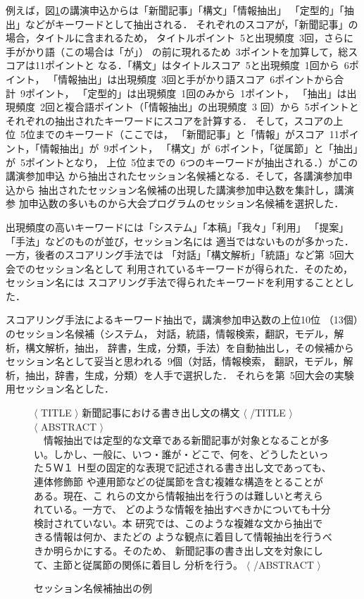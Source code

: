 例えば，図\ref{aaa}の講演申込からは「新聞記事」「構文」「情報抽出」
「定型的」「抽出」などがキーワードとして抽出される．
それぞれのスコアが，「新聞記事」の場合，タイトルに含まれるため，
タイトルポイント\ 5と出現頻度\ 3回，さらに手がかり語（この場合は「が」）
の前に現れるため\ 3ポイントを加算して，総スコアは11ポイントと
なる．「構文」はタイトルスコア\ 5と出現頻度\ 1回から\ 6ポイント，
「情報抽出」は出現頻度\ 3回と手がかり語スコア\ 6ポイントから合計\ 9ポイント，
「定型的」は出現頻度\ 1回のみから\ 1ポイント，
「抽出」は出現頻度\ 2回と複合語ポイント（「情報抽出」の出現頻度\ 3
回）から\ 5ポイントとそれぞれの抽出されたキーワードにスコアを計算する．
そして，スコアの上位\ 5位までのキーワード（ここでは，
「新聞記事」と「情報」がスコア\ 11ポイント，「情報抽出」が\ 9ポイント，
「構文」が\ 6ポイント，「従属節」と「抽出」が\ 5ポイントとなり，
上位\ 5位までの\ 6つのキーワードが抽出される．）がこの講演参加申込
から抽出されたセッション名候補となる．そして，各講演参加申込から
抽出されたセッション名候補の出現した講演参加申込数を集計し，講演参
加申込数の多いものから大会プログラムのセッション名候補を選択した．

出現頻度の高いキーワードには「システム」「本稿」「我々」「利用」
「提案」「手法」などのものが並び，セッション名には
適当ではないものが多かった．一方，後者のスコアリング手法では
「対話」「構文解析」「統語」など第\ 5回大会でのセッション名として
利用されているキーワードが得られた．そのため，セッション名には
スコアリング手法で得られたキーワードを利用することとした．

スコアリング手法によるキーワード抽出で，講演参加申込数の上位10位
（13個）のセッション名候補（システム，
対話，統語，情報検索，翻訳，モデル，解析，構文解析，抽出，
辞書，生成，分類，手法）を自動抽出し，その候補から
セッション名として妥当と思われる\ 9個（対話，情報検索，
翻訳，モデル，解析，抽出，辞書，生成，分類）を人手で選択した．
それらを第\ 5回大会の実験用セッション名とした．

\begin{figure}
\footnotesize
$\langle$ TITLE $\rangle$ 新聞記事における書き出し文の構文
$\langle$ /TITLE $\rangle$ \\
$\langle$ ABSTRACT $\rangle$ \\
　情報抽出では定型的な文章である新聞記事が対象となることが多
い。しかし、一般に、いつ・誰が・どこで、何を、どうしたといった５Ｗ１
Ｈ型の固定的な表現で記述される書き出し文であっても、連体修飾節
や連用節などの従属節を含む複雑な構造をとることがある。現在、こ
れらの文から情報抽出を行うのは難しいと考えられている。一方で、
どのような情報を抽出すべきかについても十分検討されていない。本
研究では、このような複雑な文から抽出できる情報は何か、またどの
ような観点に着目して情報抽出を行うべきか明らかにする。そのため、
新聞記事の書き出し文を対象にして、主節と従属節の関係に着目し
分析を行う。
$\langle$ /ABSTRACT $\rangle$ \\
\vspace*{-4mm}
\caption[図]{\label{aaa}セッション名候補抽出の例}
\end{figure}

